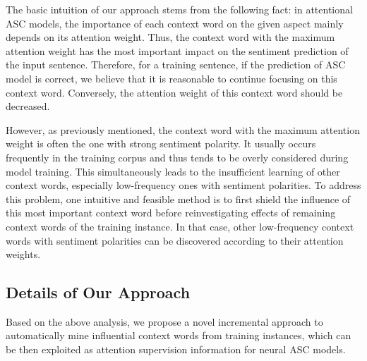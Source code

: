 \documentclass[11pt,a4paper]{article}
\begin{document}
The basic intuition of our approach stems from the following fact:
in attentional ASC models,
the importance of each context word on the given aspect mainly depends on its attention weight.
Thus,
the context word with the maximum attention weight has the most important impact on the sentiment prediction of the input sentence.
Therefore,
for a training sentence,
if the prediction of ASC model is correct,
we believe that it is reasonable to continue focusing on this context word.
Conversely,
the attention weight of this context word should be decreased.

However,
as previously mentioned,
the context word with the maximum attention weight is often the one with strong sentiment polarity.
It usually occurs frequently in the training corpus
and thus tends to be overly considered during model training.
This simultaneously leads to the insufficient learning of other context words,
especially low-frequency ones with sentiment polarities.
To address this problem,
one intuitive and feasible method is to first shield the influence of this most important context word
before reinvestigating effects of remaining context words of the training instance.
In that case,
other low-frequency context words with sentiment polarities can be discovered according to their attention weights.


\subsection{Details of Our Approach}\label{SubSection_ApproachDetails}
Based on the above analysis,
we propose a novel incremental approach to automatically mine influential context words from training instances,
which can be then exploited as attention supervision information for neural ASC models.
\end{document}
